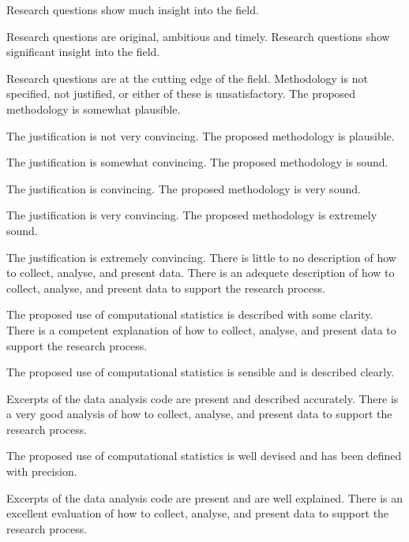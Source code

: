 \begin{markingrubric}
        \grade 		Research questions show much insight into the field.
        \par		Research questions are original, ambitious and timely.
        \grade 		Research questions show significant insight into the field.
        \par		Research questions are at the cutting edge of the field.
        \grade\fail 	Methodology is not specified, not justified, or either of these is unsatisfactory.
        \grade 		The proposed methodology is somewhat plausible.
        \par		The justification is not very convincing.
        \grade 		The proposed methodology is plausible.
        \par		The justification is somewhat convincing.
        \grade 		The proposed methodology is sound.
        \par		The justification is convincing.
        \grade 		The proposed methodology is very sound.
        \par		The justification is very convincing.
        \grade 		The proposed methodology is extremely sound.
        \par		The justification is extremely convincing.
        \grade\fail 	There is little to no description of how to collect, analyse, and present data.
        \grade 		There is an adequete description of how to collect, analyse, and present data to support the research process.
         \par		The proposed use of computational statistics is described with some clarity.        
        \grade 		There is a competent explanation of how to collect, analyse, and present data to support the research process.
         \par		The proposed use of computational statistics is sensible and is described clearly.         
        \par		Excerpts of the data analysis code are present and described accurately.                 
        \grade 		There is a very good analysis of how to collect, analyse, and present data to support the research process.
         \par		The proposed use of computational statistics is well devised and has been defined with precision.                  
        \par		Excerpts of the data analysis code are present and are well explained.   
        \grade 		There is an excellent evaluation of how to collect, analyse, and present data to support the research process.

\end{markingrubric}
